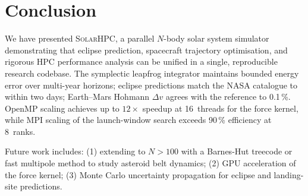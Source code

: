 \documentclass[conference]{IEEEtran}
\newcommand{\SOLARHPC}{\textsc{SolarHPC}}
\begin{document}
\section{Conclusion}
\label{sec:conclusion}

We have presented \SOLARHPC{}, a parallel $N$-body solar
system simulator demonstrating that eclipse prediction,
spacecraft trajectory optimisation, and rigorous HPC
performance analysis can be unified in a single, reproducible
research codebase.  The symplectic leapfrog integrator
maintains bounded energy error over multi-year horizons;
eclipse predictions match the NASA catalogue to within
two days; Earth--Mars Hohmann $\Delta v$ agrees with the
\citeauthor{bate1971} reference to 0.1\,\%.  OpenMP
scaling achieves up to $12\times$ speedup at 16~threads
for the force kernel, while MPI scaling of the launch-window
search exceeds 90\,\% efficiency at 8~ranks.

Future work includes: (1) extending to $N > 100$ with
a Barnes-Hut treecode or fast multipole method to study
asteroid belt dynamics; (2) GPU acceleration of the force
kernel; (3) Monte Carlo uncertainty propagation for
eclipse and landing-site predictions.



\end{document}
